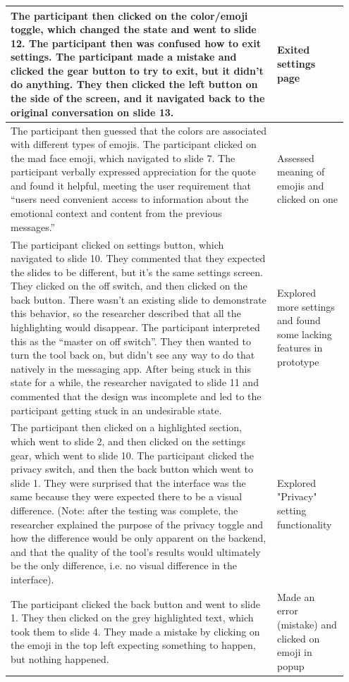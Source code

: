 \documentclass[acmsmall,screen,authorversion,nonacm]{acmart}
\begin{document}
\begin{center}
\begin{longtable}{|p{0.75\linewidth}|p{0.2\linewidth}|}
    The participant then clicked on the color/emoji toggle, which changed the state and went to slide 12. The participant then was confused how to exit settings. The participant made a mistake and clicked the gear button to try to exit, but it didn’t do anything. They then clicked the left button on the side of the screen, and it navigated back to the original conversation on slide 13. & Exited settings page \\ \hline
    The participant then guessed that the colors are associated with different types of emojis. The participant clicked on the mad face emoji, which navigated to slide 7. The participant verbally expressed appreciation for the quote and found it helpful, meeting the user requirement that “users need convenient access to information about the emotional context and content from the previous messages.” & Assessed meaning of emojis and clicked on one \\ \hline
    The participant clicked on settings button, which navigated to slide 10. They commented that they expected the slides to be different, but it’s the same settings screen. They clicked on the off switch, and then clicked on the back button. There wasn’t an existing slide to demonstrate this behavior, so the researcher described that all the highlighting would disappear. The participant interpreted this as the “master on off switch”. They then wanted to turn the tool back on, but didn’t see any way to do that natively in the messaging app. After being stuck in this state for a while, the researcher navigated to slide 11 and commented that the design was incomplete and led to the participant getting stuck in an undesirable state. & Explored more settings and found some lacking features in prototype \\ \hline
    The participant then clicked on a highlighted section, which went to slide 2, and then clicked on the settings gear, which went to slide 10. The participant clicked the privacy switch, and then the back button which went to slide 1. They were surprised that the interface was the same because they were expected there to be a visual difference. (Note: after the testing was complete, the researcher explained the purpose of the privacy toggle and how the difference would be only apparent on the backend, and that the quality of the tool’s results would ultimately be the only difference, i.e. no visual difference in the interface). & Explored "Privacy" setting functionality \\ \hline
    The participant clicked the back button and went to slide 1. They then clicked on the grey highlighted text, which took them to slide 4. They made a mistake by clicking on the emoji in the top left expecting something to happen, but nothing happened. & Made an error (mistake) and clicked on emoji in popup \\ \hline

\end{longtable}
\end{center}
\end{document}
